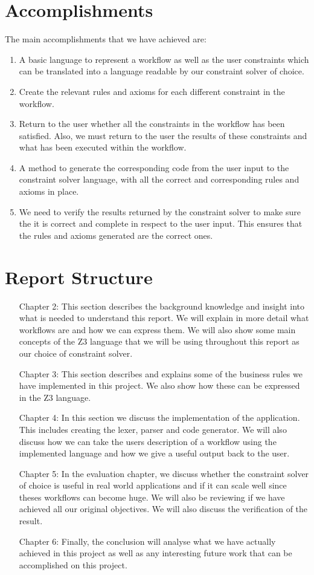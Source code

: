 \documentclass[a4paper]{report}
\begin{document}
\section{Accomplishments}
The main accomplishments that we have achieved are:
\begin{enumerate}
\item A basic language to represent a workflow as well as the user constraints which can be translated into a language readable by our constraint solver of choice.
\item Create the relevant rules and axioms for each different constraint in the workflow.
\item Return to the user whether all the constraints in the workflow has been satisfied. Also, we must return to the user the results of these constraints and what has been executed within the workflow.
\item A method to generate the corresponding code from the user input to the constraint solver language, with all the correct and corresponding rules and axioms in place. 
\item We need to verify the results returned by the constraint solver to make sure the it is correct and complete in respect to the user input. This ensures that the rules and axioms generated are the correct ones. 
\end{enumerate}

\section{Report Structure}
\begin{itemize}
\item[Chapter 2:] This section describes the background knowledge and insight into what is needed to understand this report. We will explain in more detail what workflows are and how we can express them. We will also show some main concepts of the Z3 language that we will be using throughout this report as our choice of constraint solver.  
\item[Chapter 3:] This section describes and explains some of the business rules we have implemented in this project. We also show how these can be expressed in the Z3 language. 
\item[Chapter 4:] In this section we discuss the implementation of the application. This includes creating the lexer, parser and code generator. We will also discuss how we can take the users description of a workflow using the implemented language and how we give a useful output back to the user.
\item[Chapter 5:] In the evaluation chapter, we discuss whether the constraint solver of choice is useful in real world applications and if it can scale well since theses workflows can become huge. We will also be reviewing if we have achieved all our original objectives. We will also discuss the verification of the result.
\item[Chapter 6:] Finally, the conclusion will analyse what we have actually achieved in this project as well as any interesting future work that can be accomplished on this project. 
\end{itemize}
\end{document}
